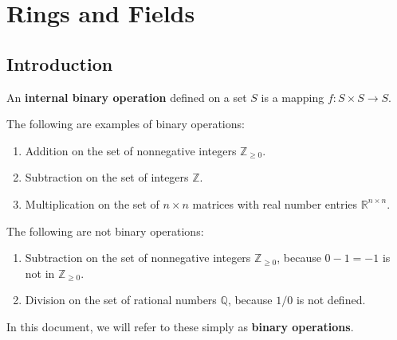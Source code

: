 \documentclass{scrartcl}
\begin{document}
\section{Rings and Fields}

\subsection{Introduction}

\begin{definition}
    \label{def:binary operation}

    \newcommand{\Q}{\mathbb{Q}}
    \newcommand{\R}{\mathbb{R}}
    \newcommand{\Z}{\mathbb{Z}}

    An \textbf{internal binary operation} defined on a set $S$ is a mapping $f:S\times S\to S$.

    The following are examples of binary operations:
    \begin{enumerate}
        \item Addition on the set of nonnegative integers $\Z_{\geq 0}$.
        \item Subtraction on the set of integers $\Z$.
        \item Multiplication on the set of $n\times n$ matrices with real number entries $\R^{n\times n}$.
    \end{enumerate}

    The following are not binary operations:
    \begin{enumerate}
        \item Subtraction on the set of nonnegative integers $\Z_{\geq 0}$, because $0-1=-1$ is not in $\Z_{\geq 0}$.
        \item Division on the set of rational numbers $\Q$, because $1/0$ is not defined.
    \end{enumerate}

    In this document, we will refer to these simply as \textbf{binary operations}.
\end{definition}
\end{document}
